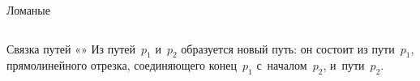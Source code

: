 \begin{frame}{Ломаные}
\begin{columns}
\begin{center}
%
\only<2>{}%
\only<3>{}%
\end{center}
\begin{programlisting}
%
%
%
\end{programlisting}
\end{columns}
\end{frame}

\begin{frame}{Связка путей «\literal{--}»}
Из путей~$p_1$ и~$p_2$ образуется новый путь: он состоит из пути~$p_1$,
\alert{прямолинейного} отрезка, соединяющего конец~$p_1$ с~началом~$p_2$,
и~пути~$p_2$.
\bigskip
\begin{columns}
\begin{center}
%
\only<2>{}
\end{center}
\begin{center}
\begin{programlisting}
%
%
%
\end{programlisting}
\end{center}
\end{columns}
\end{frame}

